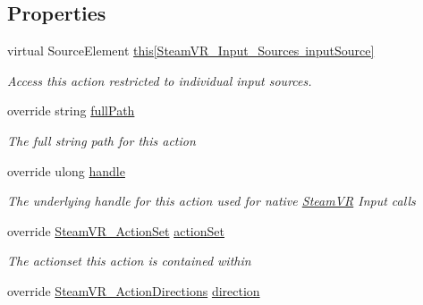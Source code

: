 \subsection*{Properties}
\begin{DoxyCompactItemize}
\item 
virtual Source\+Element \mbox{\hyperlink{class_valve_1_1_v_r_1_1_steam_v_r___action_abdb54a9331f280213d28abe5ef78ec07}{this\mbox{[}\+Steam\+V\+R\+\_\+\+Input\+\_\+\+Sources input\+Source\mbox{]}}}
\begin{DoxyCompactList}\small\item\em Access this action restricted to individual input sources. \end{DoxyCompactList}\item 
override string \mbox{\hyperlink{class_valve_1_1_v_r_1_1_steam_v_r___action_a765a5c4c2de688392f4968fa3dcf2703}{full\+Path}}
\begin{DoxyCompactList}\small\item\em The full string path for this action \end{DoxyCompactList}\item 
override ulong \mbox{\hyperlink{class_valve_1_1_v_r_1_1_steam_v_r___action_abb2ae18798c46b03be6c44872f3da084}{handle}}
\begin{DoxyCompactList}\small\item\em The underlying handle for this action used for native \mbox{\hyperlink{class_valve_1_1_v_r_1_1_steam_v_r}{Steam\+VR}} Input calls \end{DoxyCompactList}\item 
override \mbox{\hyperlink{class_valve_1_1_v_r_1_1_steam_v_r___action_set}{Steam\+V\+R\+\_\+\+Action\+Set}} \mbox{\hyperlink{class_valve_1_1_v_r_1_1_steam_v_r___action_ad4b01239b68cfa6a4b0daa1c91e2f134}{action\+Set}}
\begin{DoxyCompactList}\small\item\em The actionset this action is contained within \end{DoxyCompactList}\item 
override \mbox{\hyperlink{namespace_valve_1_1_v_r_a1e6192cb5ddaf204afab87ccb5728780}{Steam\+V\+R\+\_\+\+Action\+Directions}} \mbox{\hyperlink{class_valve_1_1_v_r_1_1_steam_v_r___action_aee8591fed8be32dde8c11ab75b830323}{direction}}

\end{DoxyCompactItemize}
